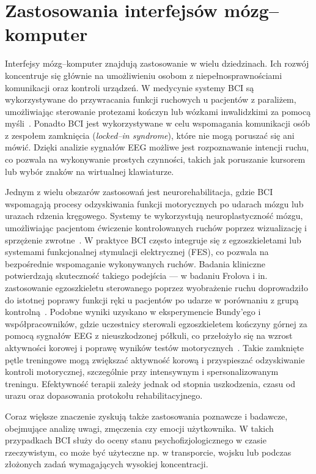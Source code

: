 \section{Zastosowania interfejsów mózg--komputer}

Interfejsy mózg--komputer znajdują zastosowanie w wielu dziedzinach. Ich rozwój koncentruje się głównie na umożliwieniu osobom z niepełnosprawnościami komunikacji oraz kontroli urządzeń. W medycynie systemy BCI są wykorzystywane do przywracania funkcji ruchowych u pacjentów z paraliżem, umożliwiając sterowanie protezami kończyn lub wózkami inwalidzkimi za pomocą myśli~\cite{hochberg2012}. Ponadto BCI jest wykorzystywane w celu wspomagania komunikacji osób z zespołem zamknięcia (\textit{locked--in syndrome}), które nie mogą poruszać się ani mówić. Dzięki analizie sygnałów EEG możliwe jest rozpoznawanie intencji ruchu, co pozwala na wykonywanie prostych czynności, takich jak poruszanie kursorem lub wybór znaków na wirtualnej klawiaturze. 

Jednym z wielu obszarów zastosowań jest neurorehabilitacja, gdzie BCI wspomagają procesy odzyskiwania funkcji motorycznych po udarach mózgu lub urazach rdzenia kręgowego. Systemy te wykorzystują neuroplastyczność mózgu, umożliwiając pacjentom ćwiczenie kontrolowanych ruchów poprzez wizualizację i sprzężenie zwrotne~\cite{dobkin2007}. W praktyce BCI często integruje się z egzoszkieletami lub systemami funkcjonalnej stymulacji elektrycznej (FES), co pozwala na bezpośrednie wspomaganie wykonywanych ruchów.
Badania kliniczne potwierdzają skuteczność takiego podejścia --- w badaniu Frolova i in. zastosowanie egzoszkieletu sterowanego poprzez wyobrażenie ruchu doprowadziło do istotnej poprawy funkcji ręki u pacjentów po udarze w porównaniu z grupą kontrolną~\cite{frolov2017}. Podobne wyniki uzyskano w eksperymencie Bundy'ego i współpracowników, gdzie uczestnicy sterowali egzoszkieletem kończyny górnej za pomocą sygnałów EEG z nieuszkodzonej półkuli, co przełożyło się na wzrost aktywności korowej i poprawę wyników testów motorycznych~\cite{bundy2017}. Takie zamknięte pętle treningowe mogą zwiększać aktywność korową i przyspieszać odzyskiwanie kontroli motorycznej, szczególnie przy intensywnym i spersonalizowanym treningu. Efektywność terapii zależy jednak od stopnia uszkodzenia, czasu od urazu oraz dopasowania protokołu rehabilitacyjnego.

Coraz większe znaczenie zyskują także zastosowania poznawcze i badawcze, obejmujące analizę uwagi, zmęczenia czy emocji użytkownika. W takich przypadkach BCI służy do oceny stanu psychofizjologicznego w czasie rzeczywistym, co może być użyteczne np. w transporcie, wojsku lub podczas złożonych zadań wymagających wysokiej koncentracji.


